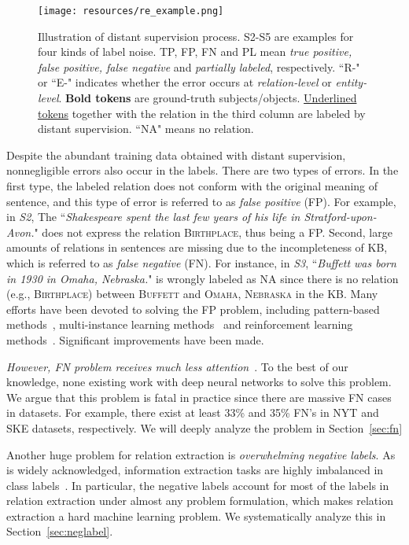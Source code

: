 \documentclass[11pt,a4paper]{article}
\begin{document}
\begin{figure}[t]
  \centering
  \texttt{[image: resources/re\_example.png]}
  \caption{Illustration of distant supervision process. S2-S5 are examples for four kinds of label noise. 
  TP, FP, FN and PL mean \textit{true positive, false positive, false negative} and \textit{partially labeled}, respectively.
  ``R-" or ``E-" indicates whether the error occurs at \textit{relation-level} or \textit{entity-level}. \textbf{Bold tokens} are ground-truth subjects/objects. \underline{Underlined tokens} together with the relation in the third column are labeled by distant supervision. ``NA" means no relation.}
  \label{fig:re_example}
\end{figure}



Despite the abundant training data obtained with distant supervision, nonnegligible errors also occur in the labels.
There are two types of errors. 
In the first type, the labeled relation does not conform with the original meaning of sentence, and this type of error is referred to as \textit{false positive} (FP). 
For example, in \textit{S2}, The ``\textit{Shakespeare spent the last few years of his life in Stratford-upon-Avon.}" does not express the relation \textsc{Birthplace}, thus being a FP. 
Second, large amounts of relations in sentences are missing due to the incompleteness of KB, which is referred to as \textit{false negative} (FN). 
For instance, in \textit{S3}, ``\textit{Buffett was born in 1930 in Omaha, Nebraska.}" is wrongly labeled as NA since there is no relation (e.g., \textsc{Birthplace}) between \textsc{Buffett} and \textsc{Omaha, Nebraska} in the KB. 
Many efforts have been devoted to solving the FP problem, including pattern-based methods~\cite{jia2019arnor}, multi-instance learning methods~\cite{lin2016neural,zeng2018large} and reinforcement learning methods~\cite{feng2018reinforcement}. Significant improvements have been made. 

\textit{However, FN problem receives much less attention}~\cite{min2013distant,xu2013filling,roller2015improving}.
To the best of our knowledge, none existing work with deep neural networks to solve this problem.
We argue that this problem is fatal in practice since there are massive FN cases in datasets. 
For example, there exist at least 33\% and 35\% FN's in NYT and SKE datasets, respectively. We will deeply analyze the problem in Section~\ref{sec:fn}

Another huge problem for relation extraction is \textit{overwhelming negative labels}.
As is widely acknowledged, information extraction tasks are highly imbalanced in class labels~\cite{Chowdhury2012ImpactOL,lin2018adaptive,Li2020DiceLF}.
In particular, the negative labels account for most of the labels in relation extraction under almost any problem formulation, which makes relation extraction a hard machine learning problem. 
We systematically analyze this in Section~\ref{sec:neglabel}.
\end{document}

